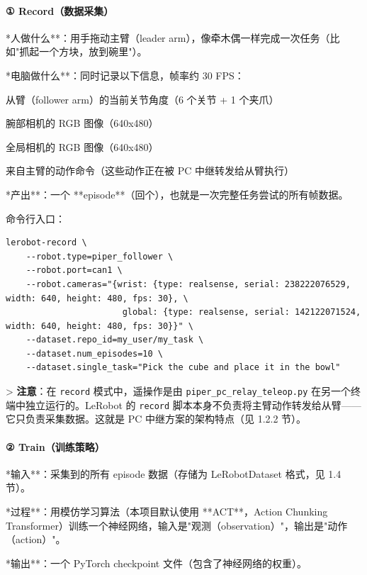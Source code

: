 \documentclass[UTF8,a4paper,11pt]{ctexart}
\begin{document}
\paragraph{① Record（数据采集）}


\item **人做什么**：用手拖动主臂（leader arm），像牵木偶一样完成一次任务（比如"抓起一个方块，放到碗里"）。
\item **电脑做什么**：同时记录以下信息，帧率约 30 FPS：
\item 从臂（follower arm）的当前关节角度（6 个关节 + 1 个夹爪）
\item 腕部相机的 RGB 图像（640x480）
\item 全局相机的 RGB 图像（640x480）
\item 来自主臂的动作命令（这些动作正在被 PC 中继转发给从臂执行）
\item **产出**：一个 **episode**（回个），也就是一次完整任务尝试的所有帧数据。

命令行入口：

\begin{lstlisting}[language=shell]
lerobot-record \
    --robot.type=piper_follower \
    --robot.port=can1 \
    --robot.cameras="{wrist: {type: realsense, serial: 238222076529, width: 640, height: 480, fps: 30}, \
                       global: {type: realsense, serial: 142122071524, width: 640, height: 480, fps: 30}}" \
    --dataset.repo_id=my_user/my_task \
    --dataset.num_episodes=10 \
    --dataset.single_task="Pick the cube and place it in the bowl"
\end{lstlisting}

> \textbf{注意}：在 \texttt{record} 模式中，遥操作是由 \texttt{piper_pc_relay_teleop.py} 在另一个终端中独立运行的。LeRobot 的 \texttt{record} 脚本本身不负责将主臂动作转发给从臂——它只负责采集数据。这就是 PC 中继方案的架构特点（见 1.2.2 节）。

\paragraph{② Train（训练策略）}


\item **输入**：采集到的所有 episode 数据（存储为 LeRobotDataset 格式，见 1.4 节）。
\item **过程**：用模仿学习算法（本项目默认使用 **ACT**，Action Chunking Transformer）训练一个神经网络，输入是"观测（observation）"，输出是"动作（action）"。
\item **输出**：一个 PyTorch checkpoint 文件（包含了神经网络的权重）。
\end{document}
